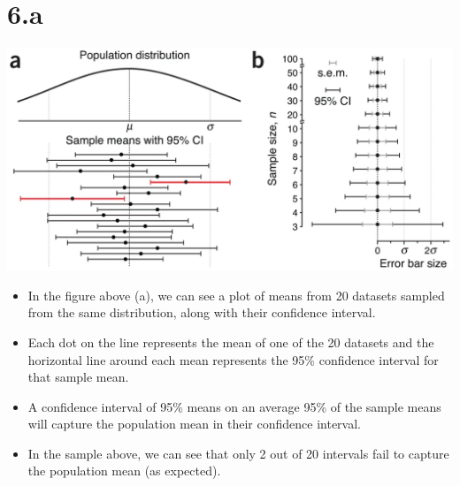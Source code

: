 \documentclass[12pt]{article}
\begin{document}
\section*{6.a}
\includegraphics*[width=\linewidth]{graph6a}
\begin{itemize}
    \item In the figure above (a), we can see a plot of means from 20 datasets
    sampled from the same distribution, along with their confidence interval.
    \item Each dot on the line represents the mean of one of the 20 datasets and
    the horizontal line around each mean represents the 95\% confidence
    interval for that sample mean.
    \item A confidence interval of 95\% means on an average 95\% of the sample
    means will capture the population mean in their confidence interval.
    \item In the sample above, we can see that only 2 out of 20 intervals fail
    to capture the population mean (as expected).
\end{itemize}

\newpage
\end{document}

